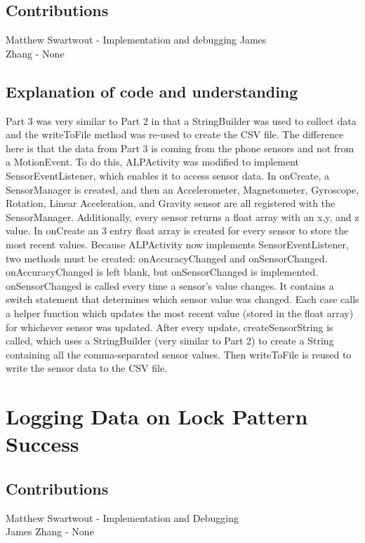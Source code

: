 \documentclass{article}
\begin{document}
\subsection{Contributions} 
Matthew Swartwout - Implementation and debugging James \\
Zhang - None    

\subsection{Explanation of code and understanding} 
Part 3 was very similar to Part 2 in
that a StringBuilder was used to collect data and the writeToFile method was
re-used to create the CSV file. The difference here is that the data from Part
3 is coming from the phone sensors and not from a MotionEvent. To do this,
ALPActivity was modified to implement SensorEventListener, which enables it to
access sensor data. In onCreate, a SensorManager is created, and then an
Accelerometer, Magnetometer, Gyroscope, Rotation, Linear Acceleration, and
Gravity sensor are all registered with the SensorManager. Additionally, every
sensor returns a float array with an x,y, and z value. In onCreate an 3 entry
float array is created for every sensor to store the most recent values.
Because ALPActivity now implements SensorEventListener, two methods must be
created: onAccuracyChanged and onSensorChanged. onAccuracyChanged is left
blank, but onSensorChanged is implemented. onSensorChanged is called every time
a sensor’s value changes. It contains a switch statement that determines which
sensor value was changed. Each case calls a helper function which updates the
most recent value (stored in the float array) for whichever sensor was updated.
After every update, createSensorString is called, which uses a StringBuilder
(very similar to Part 2) to create a String containing all the comma-separated
sensor values. Then writeToFile is reused to write the sensor data to the CSV
file.

\section{Logging Data on Lock Pattern Success}
\subsection{Contributions}
Matthew Swartwout - Implementation and Debugging \\
James Zhang - None
\end{document}
